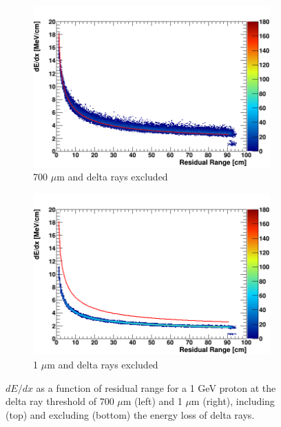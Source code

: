 \begin{figure}[ht!]
\begin{subfigure}[b]{0.495\textwidth}
            \includegraphics[width=\textwidth]{derr_proton_only_700um}
            \caption{700 $\mu$m and delta rays excluded}%
            \label{fig:derr_proton_only_700}
        \end{subfigure}
        \hfill
        \begin{subfigure}[b]{0.495\textwidth}   
            \centering 
            \includegraphics[width=\textwidth]{derr_proton_only_1um}
            \caption{1 $\mu$m and delta rays excluded}%
            \label{fig:derr_proton_only_1}
        \end{subfigure}
	\caption[Energy-Residual Range Scale of Protons at Different Delta Ray Thresholds]{
	$dE/dx$ as a function of residual range for a 1 GeV proton at the delta ray threshold of 700 $\mu$m (left) and 1 $\mu$m (right), including (top) and excluding (bottom) the energy loss of delta rays. 
	}
        \label{fig:proton_derr}
\end{figure}

